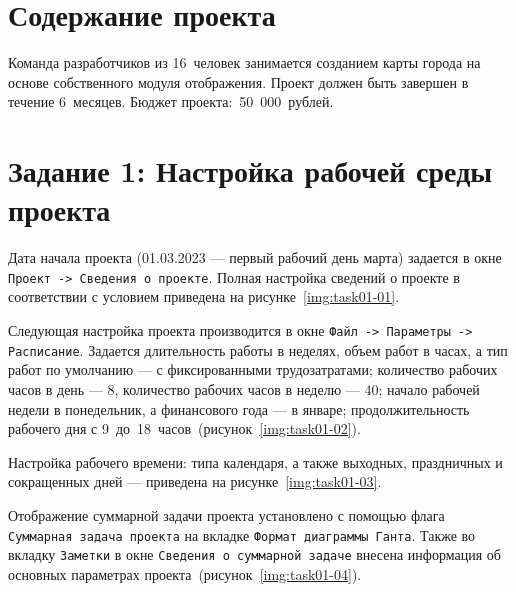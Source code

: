 \section{Содержание проекта}

Команда разработчиков из 16~человек занимается созданием карты города на основе
собственного модуля отображения. Проект должен быть завершен в течение
6~месяцев. Бюджет проекта:~50~000~рублей.

\section{Задание 1: Настройка рабочей среды проекта}

Дата начала проекта (01.03.2023 --- первый рабочий день марта) задается в окне
\texttt{Проект -> Сведения о проекте}. Полная настройка сведений о проекте в
соответствии с условием приведена на рисунке~\ref{img:task01-01}.


Следующая настройка проекта производится в окне \texttt{Файл -> Параметры ->
Расписание}.  Задается длительность работы в неделях, объем работ в часах, а тип
работ по умолчанию --- с фиксированными трудозатратами; количество рабочих
часов в день --- 8, количество рабочих часов в неделю --- 40; начало рабочей
недели в понедельник, а финансового года --- в январе; продолжительность
рабочего дня с 9~до~18~часов~(рисунок~\ref{img:task01-02}).


Настройка рабочего времени: типа календаря, а также выходных, праздничных и
сокращенных дней --- приведена на рисунке~\ref{img:task01-03}.


Отображение суммарной задачи проекта установлено с помощью флага
\texttt{Суммарная задача проекта} на вкладке \texttt{Формат диаграммы Ганта}.
Также во вкладку \texttt{Заметки} в окне \texttt{Сведения о суммарной задаче}
внесена информация об основных параметрах проекта~(рисунок~\ref{img:task01-04}).

